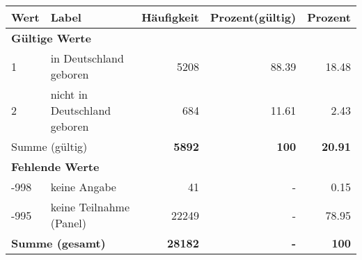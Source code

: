      \begin{longtable}{lXrrr}
     \toprule
     \textbf{Wert} & \textbf{Label} & \textbf{Häufigkeit} & \textbf{Prozent(gültig)} & \textbf{Prozent} \\
     \endhead
     \midrule
     \multicolumn{5}{l}{\textbf{Gültige Werte}}\\

     1 &
     \multicolumn{1}{X}{ in Deutschland geboren   } &


       \num{5208} &
       \num[round-mode=places,round-precision=2]{88.39} &
         \num[round-mode=places,round-precision=2]{18.48} \\

     2 &
     \multicolumn{1}{X}{ nicht in Deutschland geboren   } &


       \num{684} &
       \num[round-mode=places,round-precision=2]{11.61} &
         \num[round-mode=places,round-precision=2]{2.43} \\
     \midrule
     \multicolumn{2}{l}{Summe (gültig)} &
       \textbf{\num{5892}} &
     \textbf{\num{100}} &
       \textbf{\num[round-mode=places,round-precision=2]{20.91}} \\
     \multicolumn{5}{l}{\textbf{Fehlende Werte}}\\
       -998 &
       keine Angabe &
         \num{41} &
        - &
         \num[round-mode=places,round-precision=2]{0.15} \\
       -995 &
       keine Teilnahme (Panel) &
         \num{22249} &
        - &
         \num[round-mode=places,round-precision=2]{78.95} \\
     \midrule
     \multicolumn{2}{l}{\textbf{Summe (gesamt)}} &
          \textbf{\num{28182}} &
        \textbf{-} &
        \textbf{\num{100}} \\
     \bottomrule
     \end{longtable}
     
